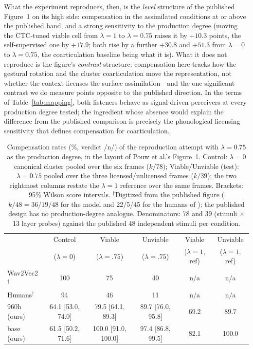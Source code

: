 \documentclass[11pt,a4paper]{article}
\newcommand{\lam}{\lambda}
\begin{document}
What the experiment reproduces, then, is the \emph{level} structure
of the published Figure~1 on its high side: compensation in the
assimilated conditions at or above the published band, and a strong
sensitivity to the production degree (moving the CTC-tuned viable
cell from $\lam=1$ to $\lam=0.75$ raises it by $+10.3$ points, the
self-supervised one by $+17.9$; both rise by a further $+30.8$ and
$+51.3$ from $\lam=0$ to $\lam=0.75$, the coarticulation baseline
being what it is). What it does not reproduce is the figure's
\emph{contrast} structure: compensation here tracks how the gestural
rotation and the cluster coarticulation move the representation, not
whether the context licenses the surface assimilation---and the one
significant contrast we do measure points opposite to the published
direction. In the terms of Table~\ref{tab:mapping}, both listeners
behave as signal-driven perceivers at every production degree
tested; the ingredient whose absence would explain the difference
from the published comparison is precisely the phonological
licensing sensitivity that defines compensation for coarticulation.

\begin{table}[t]
\small
\centering
\begin{tabular}{@{}lccccc@{}}
\toprule
 & Control & Viable & Unviable & Viable & Unviable \\
 & ($\lam=0$) & ($\lam\!=\!.75$) & ($\lam\!=\!.75$) & ($\lam\!=\!1$, ref) & ($\lam\!=\!1$, ref) \\
\midrule
Wav2Vec2$^{\dagger}$ & 100 & 75 & 40 & n/a & n/a \\
Humans$^{\dagger}$ & 94 & 46 & 11 & n/a & n/a \\
\addlinespace
960h (ours) & 64.1 [53.0, 74.0] & 79.5 [64.1, 89.3] & 89.7 [76.0, 95.8] & 69.2 & 89.7 \\
base (ours) & 61.5 [50.2, 71.6] & 100.0 [91.0, 100.0] & 97.4 [86.8, 99.5] & 82.1 & 100.0 \\
\bottomrule
\end{tabular}
\caption{Compensation rates (\%, verdict /n/) of the reproduction
attempt with $\lam=0.75$ as the production degree, in the layout of
Pouw et al.'s Figure~1. Control: $\lam=0$ canonical cluster pooled
over the six frames ($k/78$); Viable/Unviable (test): $\lam=0.75$
pooled over the three licensed/unlicensed frames ($k/39$); the two
rightmost columns restate the $\lam=1$ reference over the same frames.
Brackets: 95\% Wilson score intervals. $^{\dagger}$Digitized from the
published figure ($k/48 = 36/19/48$ for the model and 22/5/45 for the
humans of \citealp{darcy2009}); the published design has no
production-degree analogue. Denominators: 78 and 39 (stimuli $\times$ 13
layer probes) against the published 48 independent stimuli per
condition.}
\label{tab:lam075}
\end{table}
\end{document}
